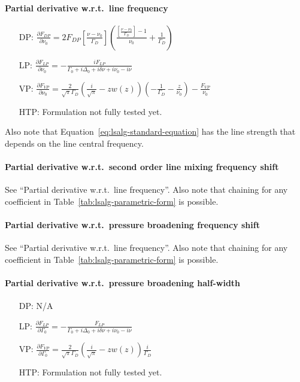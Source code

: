 \paragraph*{Partial derivative w.r.t.\ line frequency}

\begin{itemize}
 \item[DP:] $\frac{\partial F_{DP}}{\partial \nu_0} = 2F_{DP} \left[\frac{\nu-\nu_0}{\Gamma_D}\right] \left(\frac{\left[\frac{\nu - \nu_0}{\Gamma_D}\right]-1}{\nu_0}+ \frac{1}{\Gamma_D}\right)$
 
 \item[LP:] $\frac{\partial F_{LP}}{\partial\nu_0} = -\frac{iF_{LP}}{\Gamma_0+i\Delta_0+i\delta\nu+i\nu_0-i\nu}$
 
 \item[VP:] $\frac{\partial F_{VP}}{\partial \nu_0} = \frac{2}{\sqrt{\pi}\Gamma_D}\left(\frac{i}{\sqrt{\pi}} - z w\left(z\right) \right) \left(-\frac{1}{\Gamma_D}-\frac{z}{\nu_0}\right) - \frac{F_{VP}}{\nu_0}$
 
 \item[HTP:] Formulation not fully tested yet.
\end{itemize}
Also note that Equation~\ref{eq:lsalg-standard-equation} has the line strength that depends on the line central frequency. 

\paragraph*{Partial derivative w.r.t.\ second order line mixing frequency shift}

See ``Partial derivative w.r.t.\ line frequency''.  Also note that chaining for
any coefficient in Table~\ref{tab:lsalg-parametric-form} is possible.

\paragraph*{Partial derivative w.r.t.\ pressure broadening frequency shift}

See ``Partial derivative w.r.t.\ line frequency''.  Also note that chaining for
any coefficient in Table~\ref{tab:lsalg-parametric-form} is possible.

\paragraph*{Partial derivative w.r.t.\ pressure broadening half-width}

\begin{itemize}
 \item[DP:] N/A
 
 \item[LP:] $\frac{\partial F_{LP}}{\partial\Gamma_0} = -\frac{F_{LP}}{\Gamma_0+i\Delta_0+i\delta\nu+i\nu_0-i\nu}$
 
 \item[VP:] $\frac{\partial F_{VP}}{\partial \Gamma_0} = \frac{2}{\sqrt{\pi}\Gamma_D}\left(\frac{i}{\sqrt{\pi}} - z w\left(z\right) \right) \frac{i}{\Gamma_D}$
 
 \item[HTP:] Formulation not fully tested yet.
\end{itemize}

